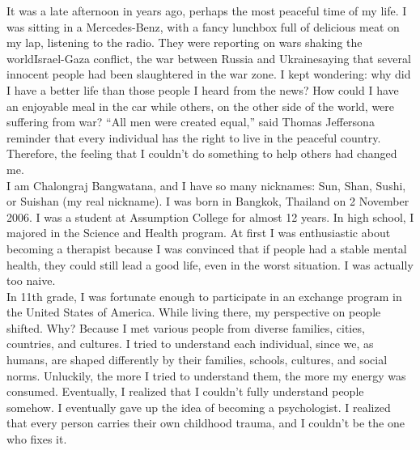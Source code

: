 \documentclass[11pt]{book}
\begin{document}
It was a late afternoon in years ago, perhaps the most peaceful time of my life. I was sitting in a Mercedes-Benz, with a fancy lunchbox full of delicious meat on my lap, listening to the radio. They were reporting on wars shaking the world\textemdash Israel-Gaza conflict, the war between Russia and Ukraine\textemdash saying that several innocent people had been slaughtered in the war zone. I kept wondering: why did I have a better life than those people I heard from the news? How could I have an enjoyable meal in the car while others, on the other side of the world, were suffering from war? ``All men were created equal,'' said Thomas Jefferson\textemdash a reminder that every individual has the right to live in the peaceful country. Therefore, the feeling that I couldn’t do something to help others had changed me.\\

I am Chalongraj Bangwatana, and I have so many nicknames: Sun, Shan, Sushi, or Suishan (my real nickname). I was born in Bangkok, Thailand on 2 November 2006. I was a student at Assumption College for almost 12 years. In high school, I majored in the Science and Health program. At first I was enthusiastic about becoming a therapist because I was convinced that if people had a stable mental health, they could still lead a good life, even in the worst situation. I was actually too naive.\\

In 11th grade, I was fortunate enough to participate in an exchange program in the United States of America. While living there, my perspective on people shifted. Why? Because I met various people from diverse families, cities, countries, and cultures. I tried to understand each individual, since we, as humans, are shaped differently by their families, schools, cultures, and social norms. Unluckily, the more I tried to understand them, the more my energy was consumed. Eventually, I realized that I couldn’t fully understand people somehow. I eventually gave up the idea of becoming a psychologist. I realized that every person carries their own childhood trauma, and I couldn't be the one who fixes it.\\
\end{document}
